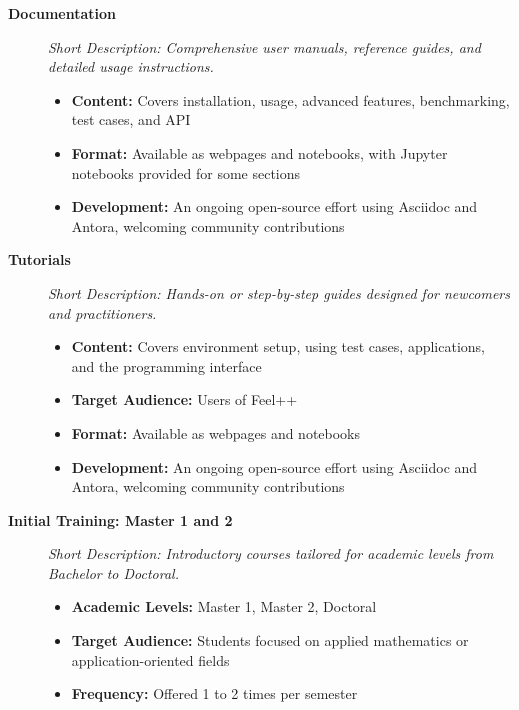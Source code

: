 \begin{description}

\item[\textbf{Documentation}]
\emph{Short Description: Comprehensive user manuals, reference guides, and detailed usage instructions.}

\begin{itemize}
\item \textbf{Content:} Covers installation, usage, advanced features, benchmarking, test cases, and API
\item \textbf{Format:} Available as webpages and notebooks, with Jupyter notebooks provided for some sections
\item \textbf{Development:} An ongoing open-source effort using Asciidoc and Antora, welcoming community contributions
\end{itemize}

\item[\textbf{Tutorials}]
\emph{Short Description: Hands-on or step-by-step guides designed for newcomers and practitioners.}

\begin{itemize}
\item \textbf{Content:} Covers environment setup, using test cases, applications, and the programming interface
\item \textbf{Target Audience:} Users of Feel++
\item \textbf{Format:} Available as webpages and notebooks
\item \textbf{Development:} An ongoing open-source effort using Asciidoc and Antora, welcoming community contributions
\end{itemize}

\item[\textbf{Initial Training: Master 1 and 2}]
\emph{Short Description: Introductory courses tailored for academic levels from Bachelor to Doctoral.}

\begin{itemize}
\item \textbf{Academic Levels:} Master 1, Master 2, Doctoral
\item \textbf{Target Audience:} Students focused on applied mathematics or application-oriented fields
\item \textbf{Frequency:} Offered 1 to 2 times per semester
\end{itemize}

\end{description}

